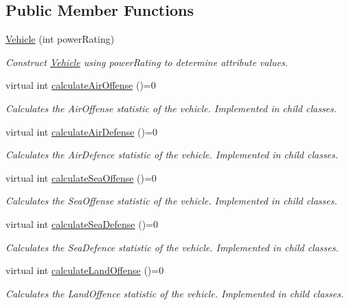 \subsection*{Public Member Functions}
\begin{DoxyCompactItemize}
\item 
\mbox{\hyperlink{class_vehicle_aaa420b5e29e24a20c7b39cd4d7aec683}{Vehicle}} (int power\+Rating)
\begin{DoxyCompactList}\small\item\em Construct \mbox{\hyperlink{class_vehicle}{Vehicle}} using power\+Rating to determine attribute values. \end{DoxyCompactList}\item 
virtual int \mbox{\hyperlink{class_vehicle_a0a6c6ed9d25c66415f83191894b11499}{calculate\+Air\+Offense}} ()=0
\begin{DoxyCompactList}\small\item\em Calculates the Air\+Offense statistic of the vehicle. Implemented in child classes. \end{DoxyCompactList}\item 
virtual int \mbox{\hyperlink{class_vehicle_ae87cbec24f436b431fbed096024c41c9}{calculate\+Air\+Defense}} ()=0
\begin{DoxyCompactList}\small\item\em Calculates the Air\+Defence statistic of the vehicle. Implemented in child classes. \end{DoxyCompactList}\item 
virtual int \mbox{\hyperlink{class_vehicle_ab70b8c0eef30b37648a1ab9903043f47}{calculate\+Sea\+Offense}} ()=0
\begin{DoxyCompactList}\small\item\em Calculates the Sea\+Offense statistic of the vehicle. Implemented in child classes. \end{DoxyCompactList}\item 
virtual int \mbox{\hyperlink{class_vehicle_a20e871b1ff13d47f4c875c987ed68add}{calculate\+Sea\+Defense}} ()=0
\begin{DoxyCompactList}\small\item\em Calculates the Sea\+Defence statistic of the vehicle. Implemented in child classes. \end{DoxyCompactList}\item 
virtual int \mbox{\hyperlink{class_vehicle_a6b272c05209a8907ebe6229e66317f4a}{calculate\+Land\+Offense}} ()=0
\begin{DoxyCompactList}\small\item\em Calculates the Land\+Offence statistic of the vehicle. Implemented in child classes. \end{DoxyCompactList}\item 

\end{DoxyCompactItemize}
